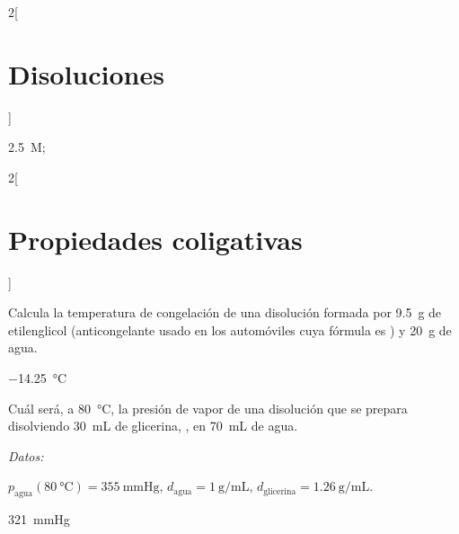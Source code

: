 \documentclass[10pt]{article}
\newenvironment{gexdatos}{
      \vspace{2pt}
      \noindent\textit{Datos:}
    }{\vspace{5pt}}
\begin{document}
\begin{multicols}{2}[
  \section{Disoluciones}
  ]
  \begin{solution}
      \SI{2.5}{M};
  \end{solution}

\end{multicols}






\begin{multicols}{2}[
  \section{Propiedades coligativas}
  ]

  \begin{exercise}[
      tags    = {termodinámica, entalpía, entalpia de reacción, calor},
      topics  = {química, termoquímica, termodinámica},
      source  = {FQ 1B OXF 2015, p79, e41},
    ]
    Calcula la temperatura de congelación de una disolución formada por \SI{9.5}{\gram} de etilenglicol (anticongelante usado en los automóviles cuya fórmula es ) y \SI{20}{\gram} de agua.
  \end{exercise}

  \begin{solution}
    \SI{-14,25}{\celsius}
  \end{solution}



  \begin{exercise}[
      tags    = {termodinámica, entalpía, entalpia de reacción, calor},
      topics  = {química, termoquímica, termodinámica},
      source  = {FQ 1B SAN 2015, p94, e51},
    ]
    Cuál será, a \SI{80}{\celsius}, la presión de vapor de una disolución que se prepara disolviendo \SI{30}{\milli\liter} de glicerina, , en \SI{70}{\milli\liter} de agua.

    \begin{gexdatos}
      \( p_{\mathrm{agua}}(\SI{80}{\celsius}) = \SI{355}{\mmHg} \),
      \( d_{\mathrm{agua}} = \SI{1}{\gram\per\milli\liter} \),
      \( d_{\mathrm{glicerina}} = \SI{1.26}{\gram\per\milli\liter} \). %
    \end{gexdatos}
  \end{exercise}

  \begin{solution}
    \SI{321}{\mmHg}
  \end{solution}





\end{multicols}
\end{document}
